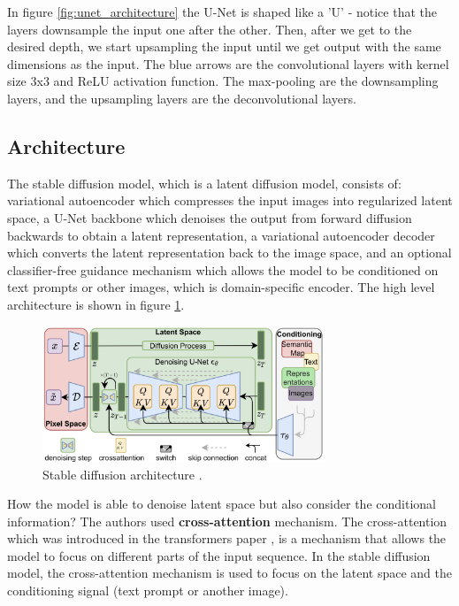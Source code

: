 In figure \ref{fig:unet_architecture} the U-Net is shaped like a 'U' - notice that the layers downsample the input one after the other. Then, after we get to the desired depth, we start upsampling the input until we get output with the same dimensions as the input. The blue arrows are the convolutional layers with kernel size 3x3 and ReLU activation function. The max-pooling are the downsampling layers, and the upsampling layers are the deconvolutional layers.







\subsection{Architecture}

The stable diffusion model, which is a latent diffusion model, consists of: variational autoencoder which compresses the input images into regularized latent space, a U-Net backbone which denoises the output from forward diffusion backwards to obtain a latent representation, a variational autoencoder decoder which converts the latent representation back to the image space, and an optional classifier-free guidance mechanism which allows the model to be conditioned on text prompts or other images, which is domain-specific encoder. The high level architecture is shown in figure \ref{fig:stable_diffusion_architecture}.

\begin{figure}
    \centering
    \includegraphics[width=0.75\textwidth]{images/diffusion_models/stable_diffusion/architecture.png}
    \caption{Stable diffusion architecture \cite{stable_diffusion}.}
    \label{fig:stable_diffusion_architecture}
\end{figure}

How the model is able to denoise latent space but also consider the conditional information? The authors used \textbf{cross-attention} mechanism. The cross-attention which was introduced in the transformers paper \cite{transformer}, is a mechanism that allows the model to focus on different parts of the input sequence. In the stable diffusion model, the cross-attention mechanism is used to focus on the latent space and the conditioning signal (text prompt or another image). 








